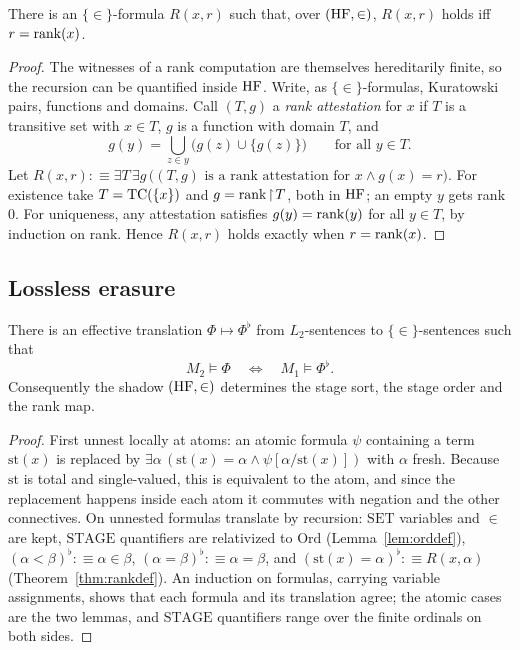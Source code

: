\begin{theorem}\label{thm:rankdef}
There is an $\{\in\}$-formula $R(x,r)$ such that, over $(\mathrm{HF},\in)$, $R(x,r)$ holds iff
$r=\operatorname{rank}(x)$.
\end{theorem}

\begin{proof}
The witnesses of a rank computation are themselves hereditarily finite, so the recursion can be
quantified inside $\mathrm{HF}$. Write, as $\{\in\}$-formulas, Kuratowski pairs, functions and domains.
Call $(T,g)$ a \emph{rank attestation} for $x$ if $T$ is a transitive set with $x\in T$, $g$ is a
function with domain $T$, and
\[
  g(y)=\textstyle\bigcup_{z\in y}\bigl(g(z)\cup\{g(z)\}\bigr)\qquad\text{for all }y\in T.
\]
Let $R(x,r):\equiv\exists T\,\exists g\,\bigl((T,g)\text{ is a rank attestation for }x\wedge
g(x)=r\bigr)$. For existence take $T=\operatorname{TC}(\{x\})$ and $g=\operatorname{rank}\!\upharpoonright\! T$, both in $\mathrm{HF}$; an empty $y$
gets rank $0$. For uniqueness, any attestation satisfies $g(y)=\operatorname{rank}(y)$ for all $y\in T$, by
induction on rank. Hence $R(x,r)$ holds exactly when $r=\operatorname{rank}(x)$.
\end{proof}

\subsection{Lossless erasure}

\begin{theorem}\label{thm:translation}
There is an effective translation $\Phi\mapsto\Phi^\flat$ from $L_2$-sentences to
$\{\in\}$-sentences such that
\[
  M_2\models\Phi\quad\Longleftrightarrow\quad M_1\models\Phi^\flat.
\]
Consequently the shadow $(\mathrm{HF},\in)$ determines the stage sort, the stage order and the rank map.
\end{theorem}

\begin{proof}
First unnest locally at atoms: an atomic formula $\psi$ containing a term $\mathrm{st}(x)$ is
replaced by $\exists\alpha\,(\mathrm{st}(x)=\alpha\wedge\psi[\alpha/\mathrm{st}(x)])$ with $\alpha$
fresh. Because $\mathrm{st}$ is total and single-valued, this is equivalent to the atom, and since
the replacement happens inside each atom it commutes with negation and the other connectives. On
unnested formulas translate by recursion: $\mathrm{SET}$ variables and $\in$ are kept,
$\mathrm{STAGE}$ quantifiers are relativized to $\mathrm{Ord}$ (Lemma~\ref{lem:orddef}),
$(\alpha<\beta)^\flat:\equiv\alpha\in\beta$, $(\alpha=\beta)^\flat:\equiv\alpha=\beta$, and
$(\mathrm{st}(x)=\alpha)^\flat:\equiv R(x,\alpha)$ (Theorem~\ref{thm:rankdef}). An induction on
formulas, carrying variable assignments, shows that each formula and its translation agree; the
atomic cases are the two lemmas, and $\mathrm{STAGE}$ quantifiers range over the finite ordinals on
both sides.
\end{proof}

